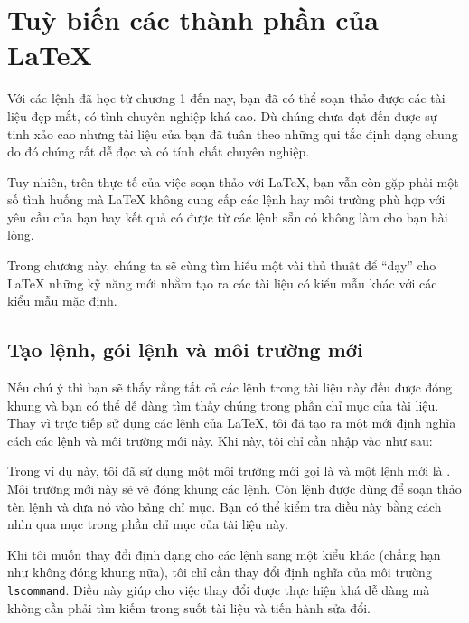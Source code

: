 \chapter{Tuỳ biến các thành phần của \LaTeX{}}

\begin{intro}
Với các lệnh đã học từ chương 1 đến nay, bạn đã có thể soạn thảo được các tài liệu đẹp mắt, có tình chuyên nghiệp khá cao. Dù chúng chưa đạt đến được sự tinh xảo cao nhưng tài liệu của bạn đã tuân theo những qui tắc định dạng chung do đó chúng rất dễ đọc và có tính chất chuyên nghiệp.

Tuy nhiên, trên thực tế của việc soạn thảo với \LaTeX{}, bạn vẫn còn gặp phải một số tình huống mà \LaTeX{} không cung cấp các lệnh hay môi trường phù hợp với yêu cầu của bạn hay kết quả có được từ các lệnh sẵn có không làm cho bạn hài lòng.

Trong chương này, chúng ta sẽ cùng tìm hiểu một vài thủ thuật để ``dạy'' cho \LaTeX{} những kỹ năng mới nhằm tạo ra các tài liệu có kiểu mẫu khác với các kiểu mẫu mặc định.
\end{intro}


\section{Tạo lệnh, gói lệnh và môi trường mới}
Nếu chú ý thì bạn sẽ thấy rằng tất cả các lệnh trong tài liệu này đều được đóng khung và bạn có thể dễ dàng tìm thấy chúng trong phần chỉ mục của tài liệu. Thay vì trực tiếp sử dụng các lệnh của \LaTeX{}, tôi đã tạo ra một  mới định nghĩa cách các lệnh và môi trường mới này. Khi này, tôi chỉ cần nhập vào như sau:

\begin{example}
\begin{lscommand}
\end{lscommand}
\end{example}
Trong ví dụ này, tôi đã sử dụng một môi trường mới gọi là  và một lệnh mới là . Môi trường mới này sẽ
vẽ đóng khung các lệnh. Còn lệnh  được dùng để soạn thảo tên lệnh và đưa nó vào bảng chỉ mục. Bạn có thể kiểm tra điều này bằng cách nhìn qua mục  trong phần chỉ mục của tài liệu này.

Khi tôi muốn thay đổi định dạng cho các lệnh sang một kiểu khác (chẳng hạn như không đóng khung nữa), tôi chỉ cần thay đổi định nghĩa của môi trường \texttt{lscommand}. Điều này giúp cho việc thay đổi được thực hiện khá dễ dàng mà không cần phải tìm kiếm trong suốt tài liệu và tiến hành sửa đổi.

